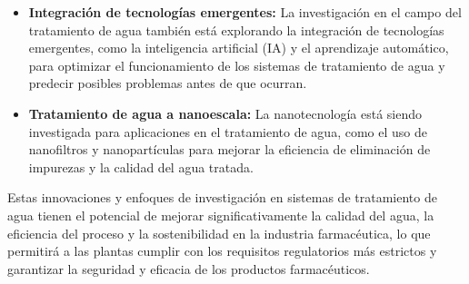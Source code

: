 \begin{itemize}
    \item \textbf{Integración de tecnologías emergentes:} La investigación en el campo del tratamiento de agua también está explorando la integración de tecnologías emergentes, como la inteligencia artificial (IA) y el aprendizaje automático, para optimizar el funcionamiento de los sistemas de tratamiento de agua y predecir posibles problemas antes de que ocurran.\\

    \item \textbf{Tratamiento de agua a nanoescala:} La nanotecnología está siendo investigada para aplicaciones en el tratamiento de agua, como el uso de nanofiltros y nanopartículas para mejorar la eficiencia de eliminación de impurezas y la calidad del agua tratada.\\

\end{itemize}

Estas innovaciones y enfoques de investigación en sistemas de tratamiento de agua tienen el potencial de mejorar significativamente la calidad del agua, la eficiencia del proceso y la sostenibilidad en la industria farmacéutica, lo que permitirá a las plantas cumplir con los requisitos regulatorios más estrictos y garantizar la seguridad y eficacia de los productos farmacéuticos.\\
